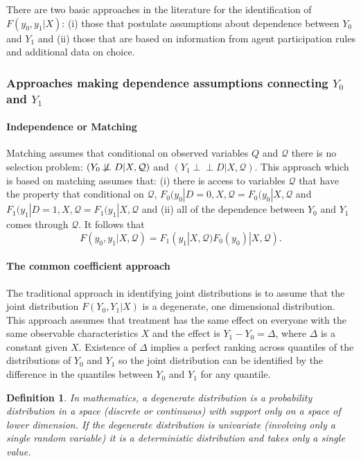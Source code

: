\documentclass[12pt]{article}
\newcommand{\indep}{\perp \!\!\! \perp}
\newcommand{\nindep}{\not\!\perp \!\!\! \perp}
\theoremstyle{definition}
\newtheorem{definition}{Definition}[section]
\begin{document}
There are two basic approaches in the literature for the identification of $F(y_0, y_1|X)$: (i) those that postulate assumptions about dependence between $Y_0$ and $Y_1$ and (ii) those that are based on information from agent participation rules and additional data on choice.

\subsubsection{Approaches making dependence assumptions connecting $Y_0$ and $Y_1$}

\paragraph{Independence or Matching}
Matching assumes that conditional on observed variables $Q$ and $\mathcal{Q}$ there is no selection problem: $(Y_0 \nindep D | X, \mathcal{Q})$ and $(Y_1 \indep D | X, \mathcal{Q})$. This approach which is based on matching assumes that: (i) there is access to variables $\mathcal{Q}$ that have the property that conditional on $\mathcal{Q}$, $F_0(y_0| D = 0, X, \mathcal{Q} = F_0(y_0| X, \mathcal{Q}$ and $F_1(y_1| D = 1, X, \mathcal{Q} = F_1(y_1| X, \mathcal{Q}$ and (ii) all of the dependence between $Y_0$ and $Y_1$ comes through $\mathcal{Q}$. It follows that $$F(y_0, y_1 | X, \mathcal{Q}) = F_1(y_1| X, \mathcal{Q})F_0(y_0)| X, \mathcal{Q}).$$

\paragraph{The common coefficient approach}
The traditional approach in identifying joint distributions is to assume that the joint distribution $F(Y_0, Y_1 | X)$ is a degenerate, one dimensional distribution. This approach assumes that treatment has the same effect on everyone with the same observable characteristics $X$ and the effect is $Y_1-Y_0 = \Delta$, where $\Delta$ is a constant given $X$. Existence of $\Delta$ implies a perfect ranking across quantiles of the distributions of $Y_0$ and $Y_1$ so the joint distribution can be identified by the difference in the quantiles between $Y_0$ and $Y_1$ for any quantile.

\theoremstyle{definition}
\begin{definition}\textit{In mathematics, a degenerate distribution is a probability distribution in a space (discrete or continuous) with support only on a space of lower dimension. If the degenerate distribution is univariate (involving only a single random variable) it is a deterministic distribution and takes only a single value.}
\end{definition}
\end{document}
